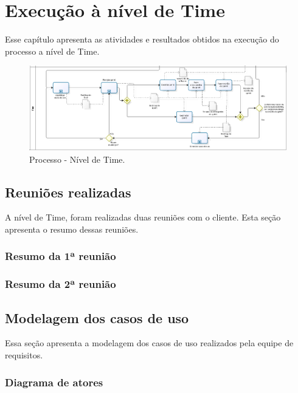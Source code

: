 \chapter{Execução à nível de Time}

  Esse capítulo apresenta as atividades e resultados obtidos na execução do processo a nível de Time.
  
  \begin{figure}[!htbp]
    \centering
    \includegraphics[scale=0.33]{figuras/processo_time}
    \caption[Processo - Nível de Time]{Processo - Nível de Time.}
    \label{processo_time}
  \end{figure}
  
  \section{Reuniões realizadas}
  
    A nível de Time, foram realizadas duas reuniões com o cliente.
    Esta seção apresenta o resumo dessas reuniões.
    
    \subsection{Resumo da 1ª reunião}
      
      
      
    \subsection{Resumo da 2ª reunião}
  
  \section{Modelagem dos casos de uso}
    
    Essa seção apresenta a modelagem dos casos de uso realizados pela equipe de requisitos.
    
    \subsection{Diagrama de atores}
    

